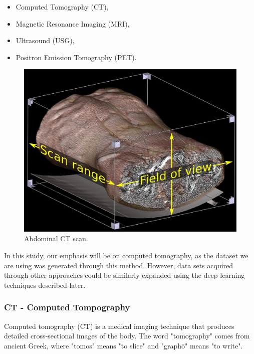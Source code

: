 \begin{itemize}
    \item Computed Tomography (CT),
    \item Magnetic Resonance Imaging (MRI),
    \item Ultrasound (USG),
    \item Positron Emission Tomography (PET).
\end{itemize}

\begin{figure}[H]
    \centering
    \includegraphics[width=0.5\linewidth]{background/1572px-Abdominal_CT_with_scan_range_and_field_of_view,_with_box_and_text.jpg}
    \caption{Abdominal CT scan\cite{abdominal-ct-scan}.}
    \label{fig:ct-scan-abdominal}
\end{figure}

In this study, our emphasis will be on computed tomography, as the dataset we are using was generated through this method. However, data sets acquired through other approaches could be similarly expanded using the deep learning techniques described later.



\newpage
\subsubsection{CT - Computed Tompography}
Computed tomography (CT) is a medical imaging technique that produces detailed cross-sectional images of the body. The word "tomography" comes from ancient Greek, where "tomos" means "to slice" and "graphō" means "to write". 

